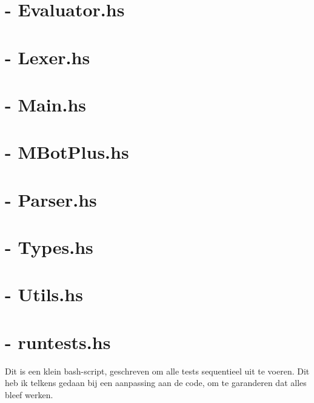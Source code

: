 \documentclass[12pt,a4paper]{report}
\begin{document}
\section{- Evaluator.hs}

\newpage
\section{- Lexer.hs}

\newpage
\section{- Main.hs}

\newpage
\section{- MBotPlus.hs}

\newpage
\section{- Parser.hs}

\newpage
\section{- Types.hs}

\newpage
\section{- Utils.hs}

\section{- runtests.hs}
Dit is een klein bash-script, geschreven om alle tests sequentieel uit te voeren. Dit heb ik telkens gedaan bij een aanpassing aan de code, om te garanderen dat alles bleef werken.

\end{document}
